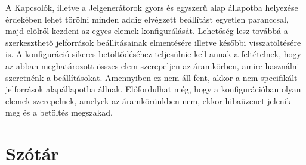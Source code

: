 A Kapcsolók, illetve a Jelgenerátorok gyors és egyszerű alap állapotba helyezése érdekében lehet törölni minden addig elvégzett beállítást egyetlen paranccsal, majd elölről kezdeni az egyes elemek konfigurálását. Lehetőség lesz továbbá a szerkeszthető jelforrások beállításainak elmentésére illetve későbbi visszatöltésére is. A konfiguráció sikeres betöltődéséhez teljesülnie kell annak a feltételnek, hogy az abban meghatározott összes elem szerepeljen az áramkörben, amire használni szeretnénk a beállításokat. Amennyiben ez nem áll fent, akkor a nem specifikált jelforrások alapállapotba állnak. Előfordulhat még, hogy a konfigurációban olyan elemek szerepelnek, amelyek az áramkörünkben nem, ekkor hibaüzenet jelenik meg és a betöltés megszakad.

\newpage

\section{Szótár}
\label{sec:dictionary}

